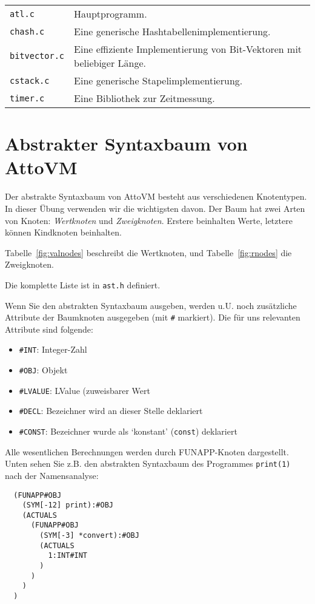 \documentclass[11pt,a4paper]{article}
\begin{document}
\begin{tabular}{p{4cm}p{12cm}}
  \texttt{atl.c} & Hauptprogramm. \\
\texttt{chash.c} & Eine generische Hashtabellenimplementierung. \\
\texttt{bitvector.c} & Eine effiziente Implementierung von Bit-Vektoren mit beliebiger Länge. \\
\texttt{cstack.c} & Eine generische Stapelimplementierung. \\
\texttt{timer.c} & Eine Bibliothek zur Zeitmessung. \\
\end{tabular}


\section{Abstrakter Syntaxbaum von AttoVM}\label{a:ast}

Der abstrakte Syntaxbaum von AttoVM besteht aus verschiedenen Knotentypen.  In dieser Übung verwenden wir die wichtigsten davon.
Der Baum hat zwei Arten von Knoten: \emph{Wertknoten} und \emph{Zweigknoten}.  Erstere beinhalten Werte, letztere können
Kindknoten beinhalten.

Tabelle~\ref{fig:valnodes} beschreibt die Wertknoten, und Tabelle~\ref{fig:rnodes} die Zweigknoten.

Die komplette Liste ist in \texttt{ast.h} definiert.

Wenn Sie den abstrakten Syntaxbaum ausgeben, werden u.U. noch
zusätzliche Attribute der Baumknoten ausgegeben (mit \texttt{\#}
markiert).  Die für uns relevanten Attribute sind folgende:

\begin{itemize}
\item   \texttt{\#INT}: Integer-Zahl
\item   \texttt{\#OBJ}: Objekt
\item   \texttt{\#LVALUE}: LValue (zuweisbarer Wert
\item   \texttt{\#DECL}: Bezeichner wird an dieser Stelle deklariert
\item   \texttt{\#CONST}: Bezeichner wurde als `konstant' (\texttt{const}) deklariert
\end{itemize}

Alle wesentlichen Berechnungen werden durch \textsf{FUNAPP}-Knoten dargestellt.  Unten sehen Sie z.B.
den abstrakten Syntaxbaum des Programmes \texttt{print(1)} nach der Namensanalyse:

\begin{verbatim}
  (FUNAPP#OBJ
    (SYM[-12] print):#OBJ
    (ACTUALS
      (FUNAPP#OBJ
        (SYM[-3] *convert):#OBJ
        (ACTUALS
          1:INT#INT
        )
      )
    )
  )
\end{verbatim}
\end{document}
